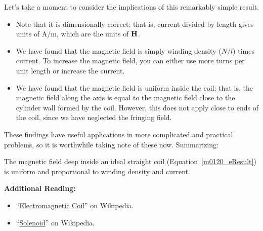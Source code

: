 Let's take a moment to consider the implications of this remarkably simple result.
%
\begin{itemize}
\item Note that it is dimensionally correct; that is, current divided by length gives units of A/m, which are the units of ${\bf H}$. 
\item We have found that the magnetic field is simply winding density ($N/l$) times current. To increase the magnetic field, you can either use more turns per unit length or increase the current.
\item We have found that the magnetic field is uniform inside the coil; that is, the magnetic field along the axis is equal to the magnetic field close to the cylinder wall formed by the coil.  However, this does not apply close to ends of the coil, since we have neglected the fringing field. 
\end{itemize}
%
These findings have useful applications in more complicated and practical problems, so it is worthwhile taking note of these now. Summarizing:
%
\begin{mdframed}[backgroundcolor=yellow!20,nobreak=true] 
The magnetic field deep inside an ideal straight coil (Equation~\ref{m0120_eResult}) is uniform and proportional to winding density and current.
\end{mdframed}


{\bf Additional Reading:}
\begin{itemize}
\item ``\href{https://en.wikipedia.org/wiki/Electromagnetic_coil}{Electromagnetic Coil}'' on Wikipedia.
\item ``\href{https://en.wikipedia.org/wiki/Solenoid}{Solenoid}'' on Wikipedia.
\end{itemize}




